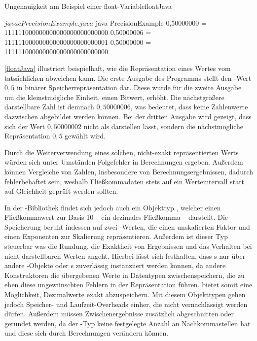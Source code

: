 \begin{codeWithCaption}{Ungenauigkeit am Beispiel einer float-Variable}{floatJava}
    \begin{shellwindow}
    $ javac PrecisionExample.java 
    $ java PrecisionExample
    0,50000000 = 111111000000000000000000000000
    0,50000006 = 111111000000000000000000000001
    0,50000000 = 111111000000000000000000000000
    \end{shellwindow}
\end{codeWithCaption}

\autoref{floatJava} illustriert beispielhaft, wie die Repräsentation eines Wertes vom tatsächlichen abweichen kann. Die erste Ausgabe des Programms stellt den -Wert $0,5$ in binärer Speicherrepräsentation dar. Diese wurde für die zweite Ausgabe um die kleinstmögliche Einheit, einen Bitwert, erhöht. Die nächstgrößere darstellbare Zahl ist demnach $0,50000006$, was bedeutet, dass keine Zahlenwerte dazwischen abgebildet werden können. Bei der dritten Ausgabe wird gezeigt, dass sich der Wert $0,50000002$ nicht als  darstellen lässt, sondern die nächstmögliche Repräsentation $0,5$ gewählt wird.

Durch die Weiterverwendung eines solchen, nicht-exakt repräsentierten Werts würden sich unter Umständen Folgefehler in Berechnungen ergeben. Außerdem können Vergleiche von Zahlen, insbesondere von Berechnungsergebnissen, dadurch fehlerbehaftet sein, weshalb Fließkommadaten stets auf ein Werteintervall statt auf Gleichheit geprüft werden sollten.

In der -Bibliothek findet sich jedoch auch ein Objekttyp , welcher einen Fließkommawert zur Basis 10 -- ein dezimales Fließkomma -- darstellt. Die Speicherung beruht in­des­sen auf zwei -Werten, die einen unskalierten Faktor und einen Exponenten zur Skalierung repräsentieren. Außerdem ist dieser Typ steuerbar was die Rundung, die Exaktheit von Ergebnissen und das Verhalten bei nicht-darstellbaren Werten angeht. Hierbei lässt sich festhalten, dass s nur über andere -Objekte oder s zuverlässig instanziiert werden können, da andere Konstruktoren die übergebenen Werte in Datentypen zwischenspeichern, die zu eben diese ungewünschten Fehlern in der Repräsentation führen.  bietet somit eine Möglichkeit, Dezimalwerte exakt abzuspeichern. Mit diesem Objekttypen gehen jedoch Speicher- und Laufzeit-Overheads einher, die nicht vernachlässigt werden dürfen. Außerdem müssen Zwischenergebnisse \idR zusätzlich abgeschnitten oder gerundet werden, da der -Typ keine festgelegte Anzahl an Nachkommastellen hat und diese sich durch Berechnungen verändern können.

